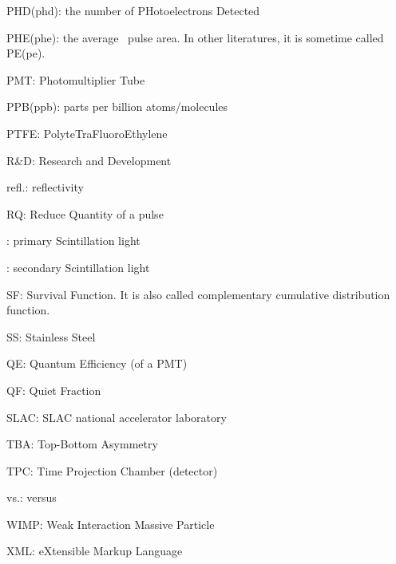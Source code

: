 PHD(phd): the number of PHotoelectrons Detected

PHE(phe): the average \sphe\ pulse area. In other literatures, it is sometime called PE(pe).

PMT: Photomultiplier Tube

PPB(ppb): parts per billion atoms/molecules

PTFE: PolyteTraFluoroEthylene

R\&D: Research and Development

refl.: reflectivity

RQ: Reduce Quantity of a pulse

\sone : primary Scintillation light

\stwo : secondary Scintillation light

SF: Survival Function. It is also called complementary cumulative distribution function.

SS: Stainless Steel

QE: Quantum Efficiency (of a PMT)

QF: Quiet Fraction

SLAC: SLAC national accelerator laboratory

TBA: Top-Bottom Asymmetry

TPC: Time Projection Chamber (detector)

vs.: versus

WIMP: Weak Interaction Massive Particle

XML: eXtensible Markup Language 


